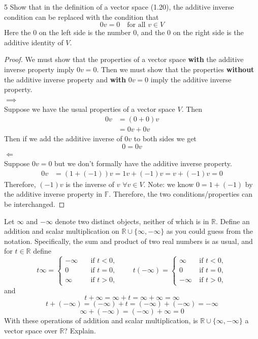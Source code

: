 \documentclass[12pt]{article}
\newenvironment{problem}[1]{\begin{prob*}{#1}{}}{\end{prob*}}
\newcommand{\F}{\mathbb{F}}
\newcommand{\R}{\mathbb{R}}
\begin{document}
    \begin{problem}{5}
        Show that in the definition of a vector space (1.20), the additive inverse condition can be replaced with the condition that
        \[0v=0 \quad \text{for all }v\in V\]
        Here the 0 on the left side is the number 0, and the 0 on the right side is the additive identity of $V$.
    \end{problem}
    \begin{proof}
    We must show that the properties of a vector space \textbf{with} the additive inverse property imply $0v=0$. Then we must show that the properties \textbf{without} the additive inverse property and \textbf{with} $0v=0$ imply the additive inverse property.\\
    $\implies$\\
    Suppose we have the usual properties of a vector space $V$. Then
    \begin{align*}
        0v&=(0+0)v\\
        &=0v+0v
    \end{align*}
    Then if we add the additive inverse of $0v$ to both sides we get
    \[0=0v\]
    $\Longleftarrow$\\
    Suppose $0v=0$ but we don't formally have the additive inverse property.
    \begin{align*}
        0v&=(1+(-1))v=1v+(-1)v=v+(-1)v=0
    \end{align*}
    Therefore, $(-1)v$ is the inverse of $v$ $\forall v\in V$.
    Note: we know $0=1+(-1)$ by the additive inverse property in $\F$.
    Therefore, the two conditions/properties can be interchanged. 
    \end{proof}
    \begin{problem}
        Let $\infty$ and $-\infty$ denote two distinct objects, neither of which is in $\R$. Define an addition and scalar multiplication on $\R \cup \{\infty,-\infty\}$ as you could guess from the notation. Specifically, the sum and product of two real numbers is as usual, and for $t\in \R$ define
        \[
        t\infty=\begin{cases}
            -\infty \quad &\text{if   } t<0,\\
            0  &\text{if   } t=0,\\
            \infty &\text{if   } t>0,
        \end{cases}
        \qquad t(-\infty)=\begin{cases}
            \infty \quad &\text{if   } t<0,\\
            0 &\text{if   } t=0,\\
            -\infty &\text{if   } t>0,
        \end{cases}
        \]
    and
    \[t+\infty = \infty + t = \infty + \infty = \infty\]
    \[t+(-\infty)=(-\infty)+t=(-\infty) +(-\infty)=-\infty\]
    \[\infty + (-\infty)=(-\infty)+\infty =0\]
    With these operations of addition and scalar multiplication, is $\R \cup \{\infty, -\infty\}$ a vector space over $\mathbb{R}$? Explain.
    \end{problem}
\end{document}
